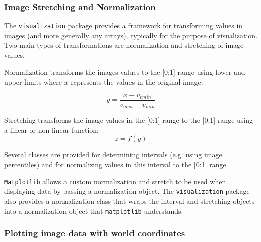 \documentclass[modern]{aastex61}
\newcommand{\package}[1]{\texttt{#1}\xspace}
\begin{document}
\subsubsection{Image Stretching and Normalization}

\label{sec:stretch}

The \package{visualization} package provides a framework for transforming values in images (and more generally any arrays), typically for the purpose of visualization. Two main types of transformations are normalization and stretching of image values.

Normalization transforms the images values to the [0:1] range using lower and upper limits where $x$ represents the values in the original image:

\begin{equation}
y = \frac{x - v_{vmin}}{v_{max} - v_{min}}
\end{equation}

Stretching transforms the image values in the [0:1] range to the [0:1] range using a linear or non-linear function:
\begin{equation}
z = f(y)
\end{equation}

Several classes are provided for determining intervals (e.g. using image percentiles) and for normalizing values in this interval to the [0:1] range.

\package{Matplotlib} allows a custom normalization and stretch to be used when displaying data by passing a normalization object.  The \package{visualization} package also provides a normalization class that wraps the interval and stretching objects into a normalization object that \package{matplotlib} understands.

\subsubsection{Plotting image data with world coordinates}
\end{document}
